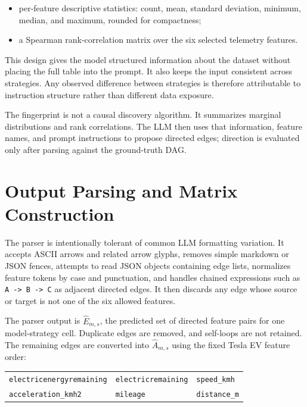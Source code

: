 \begin{itemize}
  \item per-feature descriptive statistics: count, mean, standard deviation,
  minimum, median, and maximum, rounded for compactness;
  \item a Spearman rank-correlation matrix over the six selected telemetry
  features.
\end{itemize}

This design gives the model structured information about the dataset without
placing the full table into the prompt. It also keeps the input consistent
across strategies. Any observed difference between strategies is therefore
attributable to instruction structure rather than different data exposure.

The fingerprint is not a causal discovery algorithm. It summarizes marginal
distributions and rank correlations. The LLM then uses that information,
feature names, and prompt instructions to propose directed edges; direction is
evaluated only after parsing against the ground-truth DAG.

\section{Output Parsing and Matrix Construction}

The parser is intentionally tolerant of common LLM formatting variation. It
accepts ASCII arrows and related arrow glyphs, removes simple markdown or JSON
fences, attempts to read JSON objects containing edge lists, normalizes feature
tokens by case and punctuation, and handles chained expressions such as
\texttt{A -> B -> C} as adjacent directed edges. It then discards any edge
whose source or target is not one of the six allowed features.

The parser output is \(\hat{E}_{m,s}\), the predicted set of directed feature
pairs for one model-strategy cell. Duplicate edges are removed, and self-loops
are not retained. The remaining edges are converted into \(\hat{A}_{m,s}\)
using the fixed Tesla EV feature order:

\begin{center}
\small
\begin{tabular}{@{}lll@{}}
\texttt{electricenergyremaining} & \texttt{electricremaining} & \texttt{speed\_kmh} \\
\texttt{acceleration\_kmh2} & \texttt{mileage} & \texttt{distance\_m}
\end{tabular}
\end{center}

